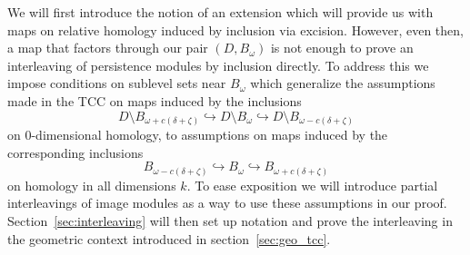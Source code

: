

We will first introduce the notion of an extension which will provide us with maps on relative homology induced by inclusion via excision.
However, even then, a map that factors through our pair $(D, B_\omega)$ is not enough to prove an interleaving of persistence modules by inclusion directly.
To address this we impose conditions on sublevel sets near $B_\omega$ which generalize the assumptions made in the TCC on maps induced by the inclusions
\[ D\setminus B_{\omega+c(\delta+\zeta)}\hookrightarrow D\setminus B_\omega\hookrightarrow D\setminus B_{\omega-c(\delta+\zeta)}\]
on $0$-dimensional homology, to assumptions on maps induced by the corresponding inclusions
\[ B_{\omega-c(\delta+\zeta)}\hookrightarrow B_\omega\hookrightarrow B_{\omega+c(\delta+\zeta)}\]
on homology in all dimensions $k$.
To ease exposition we will introduce partial interleavings of image modules as a way to use these assumptions in our proof. %
Section~\ref{sec:interleaving} will then set up notation and prove the interleaving in the geometric context introduced in section~\ref{sec:geo_tcc}.

